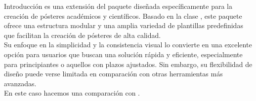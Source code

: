 \begin{block}{Introducción}
     es una extensión del paquete  diseñada específicamente para la creación de pósteres académicos y científicos.
    Basado en la clase , este paquete ofrece una estructura modular y una amplia variedad de plantillas predefinidas que facilitan la creación
    de pósteres de alta calidad.\\[1em]
    Su enfoque en la simplicidad y la consistencia visual lo convierte en una excelente opción para usuarios que buscan una solución
    rápida y eficiente, especialmente para principiantes o aquellos con plazos ajustados. Sin embargo, su flexibilidad de diseño puede verse limitada en comparación con otras herramientas más avanzadas.\\
    En este caso hacemos una comparación con .
\end{block}